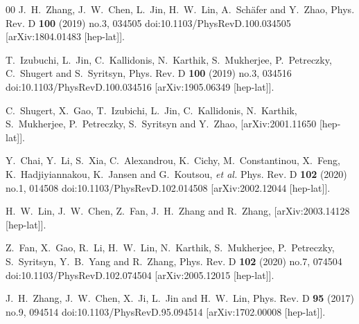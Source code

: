 \documentclass[preprint,12pt]{elsarticle}
\begin{document}
\begin{thebibliography}{00}
J.~H.~Zhang, J.~W.~Chen, L.~Jin, H.~W.~Lin, A.~Sch\"afer and Y.~Zhao,
Phys. Rev. D \textbf{100} (2019) no.3, 034505
doi:10.1103/PhysRevD.100.034505
[arXiv:1804.01483 [hep-lat]].

T.~Izubuchi, L.~Jin, C.~Kallidonis, N.~Karthik, S.~Mukherjee, P.~Petreczky, C.~Shugert and S.~Syritsyn,
Phys. Rev. D \textbf{100} (2019) no.3, 034516
doi:10.1103/PhysRevD.100.034516
[arXiv:1905.06349 [hep-lat]].

C.~Shugert, X.~Gao, T.~Izubichi, L.~Jin, C.~Kallidonis, N.~Karthik, S.~Mukherjee, P.~Petreczky, S.~Syritsyn and Y.~Zhao,
[arXiv:2001.11650 [hep-lat]].

Y.~Chai, Y.~Li, S.~Xia, C.~Alexandrou, K.~Cichy, M.~Constantinou, X.~Feng, K.~Hadjiyiannakou, K.~Jansen and G.~Koutsou, \textit{et al.}
Phys. Rev. D \textbf{102} (2020) no.1, 014508
doi:10.1103/PhysRevD.102.014508
[arXiv:2002.12044 [hep-lat]].

H.~W.~Lin, J.~W.~Chen, Z.~Fan, J.~H.~Zhang and R.~Zhang,
[arXiv:2003.14128 [hep-lat]].

Z.~Fan, X.~Gao, R.~Li, H.~W.~Lin, N.~Karthik, S.~Mukherjee, P.~Petreczky, S.~Syritsyn, Y.~B.~Yang and R.~Zhang,
Phys. Rev. D \textbf{102} (2020) no.7, 074504
doi:10.1103/PhysRevD.102.074504
[arXiv:2005.12015 [hep-lat]].

J.~H.~Zhang, J.~W.~Chen, X.~Ji, L.~Jin and H.~W.~Lin,
Phys. Rev. D \textbf{95} (2017) no.9, 094514
doi:10.1103/PhysRevD.95.094514
[arXiv:1702.00008 [hep-lat]].


\end{thebibliography}
\end{document}
